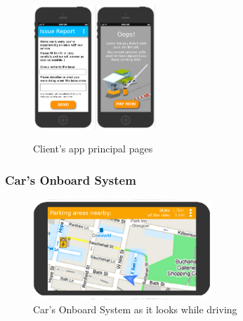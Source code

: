 \documentclass[11pt]{article} %
\begin{document}
\begin{figure}[H]
	\includegraphics[width=0.2\textwidth]{mockup/12IssueReport.png} 	\hspace{0.8cm}
	\includegraphics[width=0.2\textwidth]{mockup/10PendingBills.png} 	%
	\caption{Client's app principal pages}
\end{figure}

\subsubsection{Car's Onboard System}
\begin{figure}[H]
	\centering
	\includegraphics[width=0.6\textwidth]{mockup/CarsSystem} 
	\caption{Car's Onboard System as it looks while driving}
\end{figure}
\end{document}
